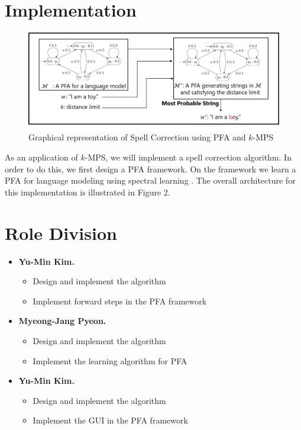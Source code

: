 \documentclass[a4paper]{article}
\begin{document}
\section{Implementation}
\begin{figure}[htbp]
\begin{center}
\includegraphics[scale=0.48]{implementation}
\caption{Graphical representation of Spell Correction using PFA and $k$-MPS} \label{fig:label}
\end{center}
\end{figure}

As an application of $k$-MPS, we will implement a spell correction algorithm. In order to do this, we first design a PFA framework. On the framework we learn a PFA for language modeling using spectral learning \cite{ballespectral}. The overall architecture for this implementation is illustrated in Figure 2.

\section{Role Division}
\begin{itemize}
\item \textbf{Yu-Min Kim.} 
\begin{itemize}
\item Design and implement the algorithm
\item Implement forward steps in the PFA framework
\end{itemize}
\item \textbf{Myeong-Jang Pyeon.} 
\begin{itemize}
\item Design and implement the algorithm
\item Implement the learning algorithm for PFA
\end{itemize}
\item \textbf{Yu-Min Kim.} 
\begin{itemize}
\item Design and implement the algorithm
\item Implement the GUI in the PFA framework
\end{itemize}
\end{itemize}
\end{document}

